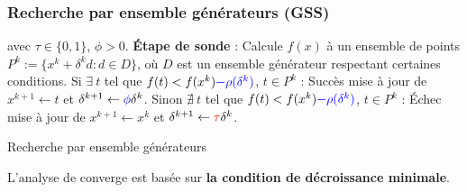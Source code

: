 \documentclass{beamer}
\newcommand\tab[1][1cm]{\hspace*{#1}}
\newcommand{\GSS}{\textsf{GSS}}
\begin{document}
\begin{frame}
\frametitle{Recherche par ensemble générateurs (\GSS)}
\begin{algorithm}[H]
\begin{algorithmic}[]
\STATE avec $\tau \in \{0,1\}$, $\phi > 0$.
\STATE \textbf{Étape de sonde} : Calcule $f(x)$ à un ensemble de points 
\STATE $P^k:=\{x^k+\delta ^k d:d\in D\}$, où {\color{blue}$D$ est un ensemble générateur 
\STATE respectant certaines conditions}.
\STATE
\STATE Si $\exists~t$ tel que $f(t) < f(x^k){\color{blue}-\rho(\delta^k)}$, $t\in P^k$ : Succès
\STATE \tab mise à jour de $x^{k+1}\leftarrow t$ et $\delta^{k+1} \leftarrow {\color{blue}\phi}\delta^k$.
\STATE
\STATE Sinon $\nexists~t$ tel que $f(t) < f(x^k){\color{blue}-\rho(\delta^k)}$, $t\in P^k$ : Échec
\STATE \tab mise à jour de $x^{k+1}\leftarrow x^k$ et $\delta^{k+1} \leftarrow {\color{red}\tau}\delta^k$.
\ENDFOR
\end{algorithmic}
\caption{Recherche par ensemble générateurs}
\label{alg:gss}
\end{algorithm}
L'analyse de converge est basée sur \textbf{la condition de décroissance minimale}.
\end{frame}
\end{document}
